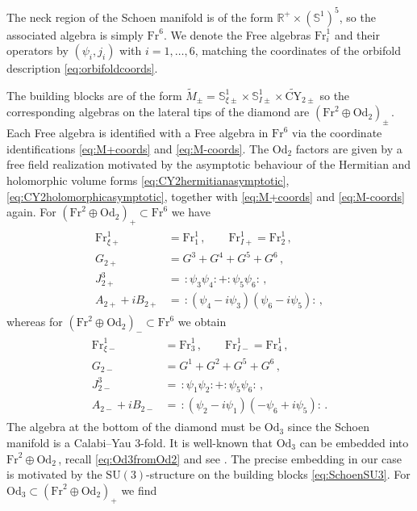 \documentclass{pspum-l}
\newcommand{\normord}[1]{:\mathrel{#1}:} %
\newcommand*\Sc{\mathbb{S}}
\newcommand*\R{\mathbb{R}}
\theoremstyle{definition}
\theoremstyle{remark}
\numberwithin{equation}{section}
\begin{document}
The neck region of the Schoen manifold is of the form $\R^+\times\left(\Sc^1\right)^5$, so the associated algebra is simply $\text{Fr}^6$. We denote the Free algebras $\text{Fr}^1_i$ and their operators by $(\psi_i,j_i)$ with $i=1,\dots,6$, matching the coordinates of the orbifold description \eqref{eq:orbifoldcoords}.

The building blocks are of the form $\widetilde{M}_\pm = \Sc^1_{\xi\pm}\times \Sc^1_{I\pm} \times \widetilde{\text{CY}}_{2\pm}$  so the corresponding algebras on the lateral tips of the diamond are $\left( \text{Fr}^2\oplus \text{Od}_2 \right)_\pm \,$. Each Free algebra is identified with a Free algebra in $\text{Fr}^6$ via the coordinate identifications \eqref{eq:M+coords} and \eqref{eq:M-coords}. The $\text{Od}_2$ factors are given by a free field realization motivated by the asymptotic behaviour of the Hermitian and holomorphic volume forms \eqref{eq:CY2hermitianasymptotic}, \eqref{eq:CY2holomorphicasymptotic}, together with \eqref{eq:M+coords} and \eqref{eq:M-coords} again. For $\left( \text{Fr}^2\oplus \text{Od}_2 \right)_+\subset\text{Fr}^6$ we have
\begin{align}
\begin{split}
\label{eq:Od2+inFree}
    \text{Fr}^1_{\xi+}&=\text{Fr}^1_1 \, , \qquad \text{Fr}^1_{I+}=\text{Fr}^1_2 \, , \\
     G_{2+}&=G^3 + G^4 + G^5 + G^6 \, ,\\
     J^3_{2+}&=\,\normord{\psi_3\psi_4}+\normord{\psi_5\psi_6} \, ,\\
    A_{2+}+i B_{2+}&=\,\normord{(\psi_4-i\psi_3)(\psi_6-i\psi_5)} \, ,
\end{split}
\end{align}
whereas for $\left( \text{Fr}^2\oplus \text{Od}_2 \right)_-\subset\text{Fr}^6$ we obtain
\begin{align}
\begin{split}
\label{eq:Od2-inFree}
    \text{Fr}^1_{\xi-}&=\text{Fr}^1_3 \, , \qquad \text{Fr}^1_{I-}=\text{Fr}^1_4 \, , \\
     G_{2-}&=G^1 + G^2 + G^5 + G^6 \, ,\\
     J^3_{2-}&=\,\normord{\psi_1\psi_2}+\normord{\psi_5\psi_6} \, ,\\
    A_{2-}+i B_{2-}&=\,\normord{(\psi_2-i\psi_1)(-\psi_6+i\psi_5)} \, .
\end{split}
\end{align}
The algebra at the bottom of the diamond must be $\text{Od}_3$ since the Schoen manifold is a Calabi--Yau 3-fold. It is well-known that $\text{Od}_3$ can be embedded into $\text{Fr}^2\oplus \text{Od}_2\,$, recall \eqref{eq:Od3fromOd2} and see \cite{Fiset:2018huv}. The precise embedding in our case is motivated by the $\text{SU}(3)$-structure on the building blocks \eqref{eq:SchoenSU3}. For $\text{Od}_3\subset\left( \text{Fr}^2\oplus \text{Od}_2 \right)_+$ we find
\end{document}
